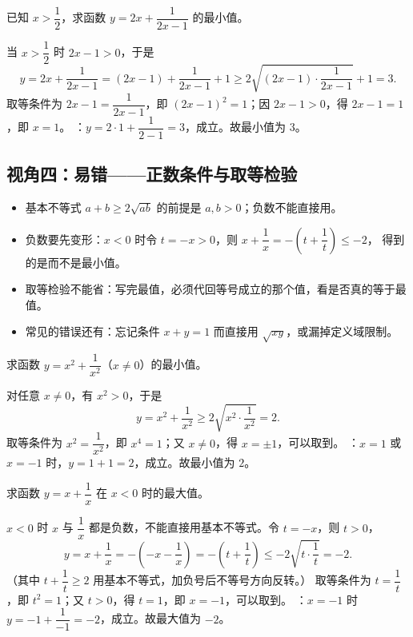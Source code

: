 \begin{explore}
\begin{problem}
已知 $x>\dfrac12$，求函数 $y=2x+\dfrac{1}{2x-1}$ 的最小值。
\end{problem}
\begin{solution}
当 $x>\dfrac12$ 时 $2x-1>0$，于是
\[
  y=2x+\frac{1}{2x-1}=(2x-1)+\frac{1}{2x-1}+1
  \geq2\sqrt{(2x-1)\cdot\frac{1}{2x-1}}+1=3.
\]
取等条件为 $2x-1=\dfrac{1}{2x-1}$，即 $(2x-1)^2=1$；因 $2x-1>0$，得 $2x-1=1$，即 $x=1$。
：$y=2\cdot1+\dfrac1{2-1}=3$，成立。故最小值为 $3$。
\end{solution}

\subsection{视角四：易错——正数条件与取等检验}

\begin{itemize}
  \item 基本不等式 $a+b\geq2\sqrt{ab}$ 的前提是 $a,b>0$；负数不能直接用。
  \item 负数要先变形：$x<0$ 时令 $t=-x>0$，则 $x+\dfrac1x=-\left(t+\dfrac1t\right)\leq-2$，
        得到的是而不是最小值。
  \item 取等检验不能省：写完最值，必须代回等号成立的那个值，看是否真的等于最值。
  \item 常见的错误还有：忘记条件 $x+y=1$ 而直接用 $\sqrt{xy}$，或漏掉定义域限制。
\end{itemize}

\begin{example}
求函数 $y=x^2+\dfrac{1}{x^2}$（$x\neq0$）的最小值。
\end{example}
\begin{solution}
对任意 $x\neq0$，有 $x^2>0$，于是
\[
  y=x^2+\frac1{x^2}\geq2\sqrt{x^2\cdot\frac1{x^2}}=2.
\]
取等条件为 $x^2=\dfrac1{x^2}$，即 $x^4=1$；又 $x\neq0$，得 $x=\pm1$，可以取到。
：$x=1$ 或 $x=-1$ 时，$y=1+1=2$，成立。故最小值为 $2$。
\end{solution}

\begin{problem}
求函数 $y=x+\dfrac1x$ 在 $x<0$ 时的最大值。
\end{problem}
\begin{solution}
$x<0$ 时 $x$ 与 $\dfrac1x$ 都是负数，不能直接用基本不等式。令 $t=-x$，则 $t>0$，
\[
  y=x+\frac1x=-\left(-x-\frac1x\right)=-\left(t+\frac1t\right)
  \leq-2\sqrt{t\cdot\frac1t}=-2.
\]
（其中 $t+\dfrac1t\geq2$ 用基本不等式，加负号后不等号方向反转。）
取等条件为 $t=\dfrac1t$，即 $t^2=1$；又 $t>0$，得 $t=1$，即 $x=-1$，可以取到。
：$x=-1$ 时 $y=-1+\dfrac1{-1}=-2$，成立。故最大值为 $-2$。
\end{solution}


\end{explore}
